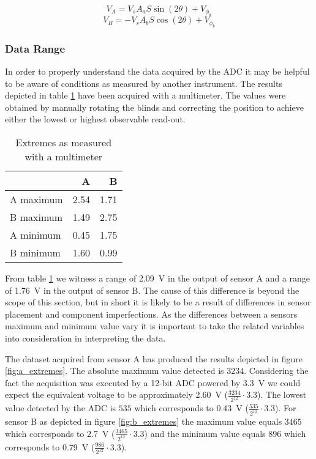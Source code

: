 \documentclass[]{article}
\begin{document}
$$V_A = V_s A_a S\sin(2\theta) + V_{\phi_a}$$
$$V_B = -V_s A_b S\cos(2\theta) + V_{\phi_b}$$

\subsubsection{Data Range}
In order to properly understand the data acquired by the ADC it may be
helpful to be aware of conditions as measured by another instrument. The 
results depicted in table \ref{table:extremes} have been acquired with a 
multimeter. The values were obtained by manually rotating the blinds
and correcting the position to achieve either the lowest or highest observable
read-out.

\begin{table}[h!]
  \begin{center}
    \caption{Extremes as measured with a multimeter}
    \label{table:extremes}
    \begin{tabular}{lrr}
      \toprule
      & A & B \\
      \midrule
      A maximum & 2.54 & 1.71 \\
      B maximum & 1.49 & 2.75 \\
      A minimum & 0.45 & 1.75 \\
      B minimum & 1.60 & 0.99 \\
      \bottomrule
    \end{tabular}
  \end{center}
\end{table}

From table \ref{table:extremes} we witness a range of \SI{2.09}{V} in the 
output of sensor A and a range of \SI{1.76}{V} in the output of sensor B. The
cause of this difference is beyond the scope of this section, but in short it
is likely to be a result of differences in sensor placement and component
imperfections. As the differences between a sensors maximum and minimum value
vary it is important to take the related variables into consideration in 
interpreting the data.

The dataset acquired from sensor A has produced the results depicted in figure 
\ref{fig:a_extremes}. The absolute maximum value detected is $3234$. Considering
the fact the acquisition was executed by a 12-bit ADC powered by \SI{3.3}{V}
we could expect the equivalent voltage to be approximately \SI{2.60}{V} ($\frac{3234}{2^{12}}\cdot 3.3$).
The lowest value detected by the ADC is $535$ which corresponds to \SI{0.43}{V} 
($\frac{535}{2^{12}}\cdot 3.3$). For sensor B as depicted in figure 
\ref{fig:b_extremes} the maximum value equals $3465$
which corresponds to \SI{2.7}{V} ($\frac{3465}{2^{12}}\cdot 3.3$) and the 
minimum value equals $896$ which corresponds to \SI{0.79}{V} 
($\frac{986}{2^{12}}\cdot 3.3$).
\end{document}
